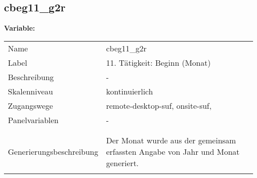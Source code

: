 	
	
	\subsection{cbeg11\_g2r}
	\label{subSection:cbeg11_g2r}

	\noindent\textbf{Variable:}\\
		\begin{tabular}{lL{11.3cm}}
			\label{tableVariable:cbeg11_g2r}
			Name & cbeg11\_g2r \\
			Label & 11. Tätigkeit: Beginn (Monat)  \\
			Beschreibung & - \\
			Skalenniveau & kontinuierlich \\
			Zugangswege &
				remote-desktop-suf,
				onsite-suf,
 \\
			Panelvariablen & -
			 \\
			 \\
 \\
					Generierungsbeschreibung & Der Monat wurde aus der gemeinsam erfassten Angabe von Jahr und Monat generiert. 
				 \\	
			 \\
		\end{tabular}





